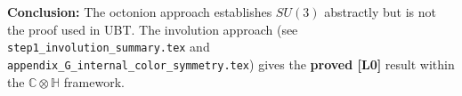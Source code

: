 \documentclass[12pt,a4paper]{article}
\theoremstyle{definition}
\theoremstyle{remark}
\begin{document}
\begin{gapbox}
\textbf{Conclusion:} The octonion approach establishes $SU(3)$ abstractly
but is not the proof used in UBT.  The involution approach
(see \texttt{step1\_involution\_summary.tex} and
\texttt{appendix\_G\_internal\_color\_symmetry.tex}) gives the
\textbf{proved [L0]} result within the $\mathbb{C}\otimes\mathbb{H}$
framework.
\end{gapbox}

\ifdefined\INCLUDEMODE
\else
  
\end{document}
